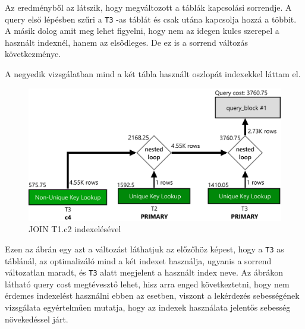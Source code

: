 Az eredményből az látszik, hogy megváltozott a táblák kapcsolási sorrendje. A query első lépésben szűri a \texttt{T3} -as táblát és csak utána kapcsolja hozzá a többit. A másik dolog amit meg lehet figyelni, hogy nem az idegen kulcs szerepel a használt indexnél, hanem az elsődleges. De ez is a sorrend változás következménye.

A negyedik vizsgálatban mind a két tábla használt oszlopát indexekkel láttam el.
\begin{figure}[h!]
\centering
\includegraphics[width=14cm]{images/explain/3-3.png}
\caption{JOIN T1.c2 indexelésével}
\label{fig:schema}
\end{figure}

Ezen az ábrán egy azt a változást láthatjuk az előzőhöz képest, hogy a \texttt{T3} as táblánál, az optimalizáló mind a két indexet használja, ugyanis a sorrend változatlan maradt, és \texttt{T3} alatt megjelent a használt index neve.
Az ábrákon látható query cost megtévesztő lehet, hisz arra enged következtetni, hogy nem érdemes indexelést használni ebben az esetben, viszont a lekérdezés sebességének vizsgálata egyértelműen mutatja, hogy az indexek használata jelentős sebesség növekedéssel járt. 
